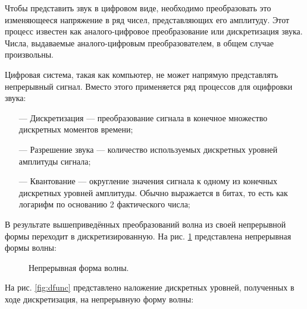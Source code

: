 	\par Чтобы представить звук в цифровом виде, необходимо преобразовать это изменяющееся напряжение в ряд чисел, представляющих его амплитуду.
	Этот процесс известен как аналого-цифровое преобразование или дискретизация звука. 
	Числа, выдаваемые аналого-цифровым преобразователем, в общем случае произвольны.
	
	\par Цифровая система, такая как компьютер, не может напрямую представлять непрерывный сигнал.
	Вместо этого применяется ряд процессов для оцифровки звука:
	\begin{itemize}
		\item[---] Дискретизация --- преобразование сигнала в конечное множество дискретных моментов времени;
		\item[---] Разрешение звука --- количество используемых дискретных уровней амплитуды сигнала;
		\item[---] Квантование --- округление значения сигнала к одному из конечных дискретных уровней амплитуды. Обычно выражается в битах, то есть как логарифм по основанию 2 фактического числа;
	\end{itemize} 
	В результате вышеприведённых преобразований волна из своей непрерывной формы переходит в дискретизированную.
	На рис. \ref{fig:func} представлена непрерывная формы волны:

	\begin{figure}[!h]
		\caption{Непрерывная форма волны.}
		\label{fig:func}
	\end{figure}

	На рис. \ref{fig:dfunc} представлено наложение дискретных уровней, полученных в ходе дискретизация, на непрерывную форму волны:

